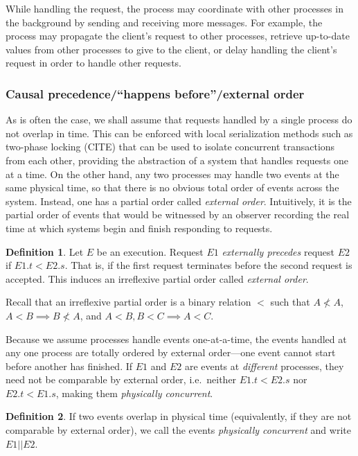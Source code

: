 \documentclass[]             %
{NASA}                       %
\theoremstyle{definition}
\newtheorem{definition}{Definition}[section]
\begin{document}
While handling the request, the process may coordinate with other
processes in the background by sending and receiving more messages. For
example, the process may propagate the client's request to other
processes, retrieve up-to-date values from other processes to give to
the client, or delay handling the client's request in order to handle
other requests.

\subsubsection{Causal precedence/``happens before''/external
order}\label{causal-precedencehappens-beforeexternal-order}

As is often the case, we shall assume that requests handled by a single
process do not overlap in time. This can be enforced with local
serialization methods such as two-phase locking (CITE) that can be used
to isolate concurrent transactions from each other, providing the
abstraction of a system that handles requests one at a time. On the
other hand, any two processes may handle two events at the same physical
time, so that there is no obvious total order of events across the
system. Instead, one has a partial order called \emph{external order}.
Intuitively, it is the partial order of events that would be witnessed
by an observer recording the real time at which systems begin and finish
responding to requests.

\begin{definition}
Let $E$ be an execution. Request $E1$ \emph{externally precedes}
request $E2$ if $E1.t < E2.s$. That is, if the first request
terminates before the second request is accepted. This induces an
irreflexive partial order called \emph{external order}.
\end{definition}

Recall that an irreflexive partial order is a binary relation \(<\) such
that \(A \not < A\), \(A < B \implies B \not < A\), and
\(A < B, B < C \implies A < C\).

Because we assume processes handle events one-at-a-time, the events
handled at any one process are totally ordered by external order---one
event cannot start before another has finished. If \(E1\) and \(E2\) are
events at \emph{different} processes, they need not be comparable by
external order, i.e.~neither \(E1.t < E2.s\) nor \(E2.t < E1.s\), making
them \emph{physically concurrent}.

\begin{definition}
If two events overlap in physical time
(equivalently, if they are not comparable by external order), we call the events \emph{physically concurrent} and
write $E1 || E2$.
\end{definition}
\end{document}
